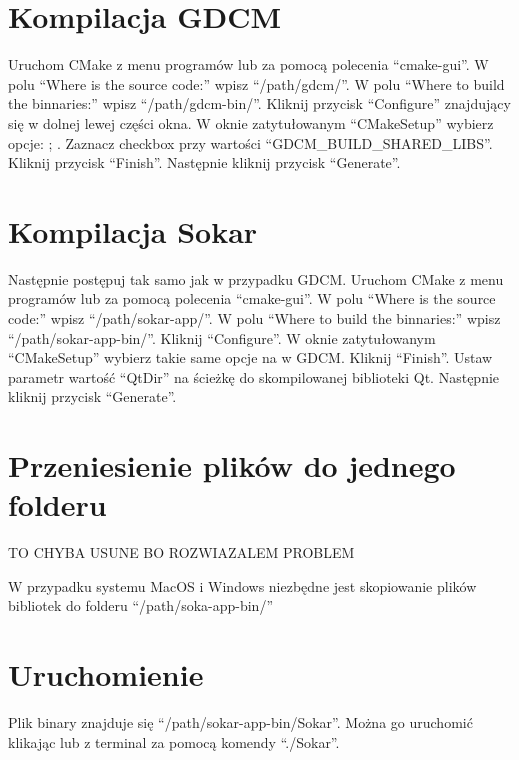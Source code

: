 \section{Kompilacja GDCM}

Uruchom CMake z menu programów lub za pomocą polecenia \enquote{cmake-gui}.
W polu \enquote{Where is the source code:} wpisz \enquote{/path/gdcm/}.
W polu \enquote{Where to build the binnaries:} wpisz \enquote{/path/gdcm-bin/}.
Kliknij przycisk \enquote{Configure} znajdujący się w dolnej lewej części okna.
W oknie zatytułowanym \enquote{CMakeSetup} wybierz opcje: ; .
Zaznacz checkbox przy wartości \enquote{GDCM\_BUILD\_SHARED\_LIBS}.
Kliknij przycisk \enquote{Finish}.
Następnie kliknij przycisk \enquote{Generate}.

\section{Kompilacja Sokar}

\par
Następnie postępuj tak samo jak w przypadku GDCM.
Uruchom CMake z menu programów lub za pomocą polecenia \enquote{cmake-gui}.
W polu \enquote{Where is the source code:} wpisz \enquote{/path/sokar-app/}.
W polu \enquote{Where to build the binnaries:} wpisz \enquote{/path/sokar-app-bin/}.
Kliknij \enquote{Configure}.
W oknie zatytułowanym \enquote{CMakeSetup} wybierz takie same opcje na w GDCM.
Kliknij \enquote{Finish}.
Ustaw parametr wartość \enquote{QtDir} na ścieżkę do skompilowanej biblioteki Qt.
Następnie kliknij przycisk \enquote{Generate}.

\section{Przeniesienie plików do jednego folderu}
TO CHYBA USUNE BO ROZWIAZALEM PROBLEM
\par
W przypadku systemu MacOS i Windows niezbędne jest skopiowanie plików bibliotek do folderu \enquote{/path/soka-app-bin/}

\section{Uruchomienie}

Plik binary znajduje się \enquote{/path/sokar-app-bin/Sokar}.
Można go uruchomić klikając lub z terminal za pomocą komendy \enquote{./Sokar}.
